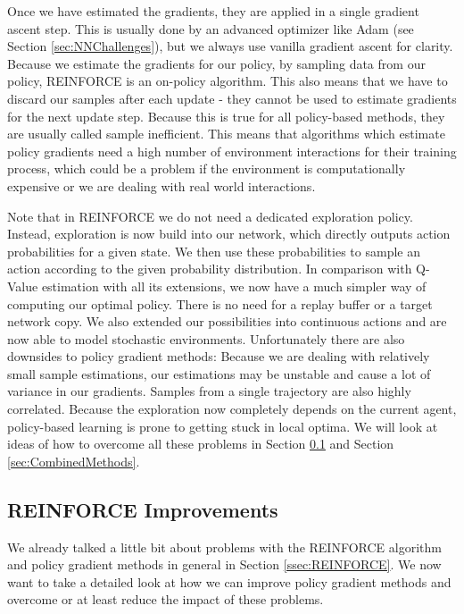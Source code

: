 Once we have estimated the gradients, they are applied in a single gradient ascent step. This is usually done by an advanced optimizer like Adam (see Section \ref{sec:NNChallenges}), but we always use vanilla gradient ascent for clarity. Because we estimate the gradients for our policy, by sampling data from our policy, REINFORCE is an on-policy algorithm. This also means that we have to discard our samples after each update - they cannot be used to estimate gradients for the next update step. Because this is true for all policy-based methods, they are usually called sample inefficient. This means that algorithms which estimate policy gradients need a high number of environment interactions for their training process, which could be a problem if the environment is computationally expensive or we are dealing with real world interactions.

Note that in REINFORCE we do not need a dedicated exploration policy. Instead, exploration is now build into our network, which directly outputs action probabilities for a given state. We then use these probabilities to sample an action according to the given probability distribution. In comparison with Q-Value estimation with all its extensions, we now have a much simpler way of computing our optimal policy. There is no need for a replay buffer or a target network copy. We also extended our possibilities into continuous actions and are now able to model stochastic environments. Unfortunately there are also downsides to policy gradient methods: Because we are dealing with relatively small sample estimations, our estimations may be unstable and cause a lot of variance in our gradients. Samples from a single trajectory are also highly correlated. Because the exploration now completely depends on the current agent, policy-based learning is prone to getting stuck in local optima. We will look at ideas of how to overcome all these problems in Section \ref{ssec:ImprovingPG} and Section \ref{sec:CombinedMethods}.

\subsection{REINFORCE Improvements} \label{ssec:ImprovingPG}
We already talked a little bit about problems with the REINFORCE algorithm and policy gradient methods in general in Section \ref{ssec:REINFORCE}. We now want to take a detailed look at how we can improve policy gradient methods and overcome or at least reduce the impact of these problems.

